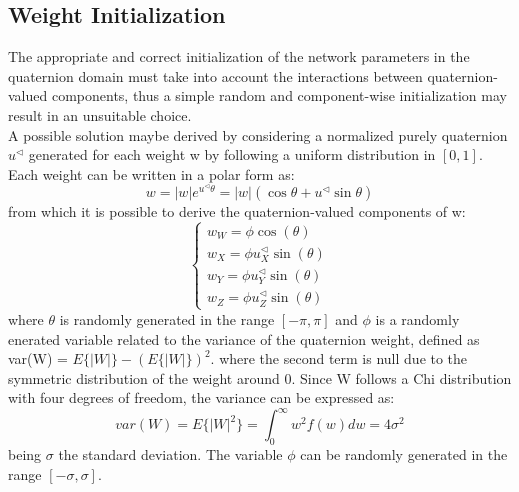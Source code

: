 \documentclass{article}
\begin{document}
    \subsection{Weight Initialization}
    The appropriate and correct initialization of the network parameters in the quaternion domain must take into account the
    interactions between quaternion-valued components,  thus a simple random and component-wise initialization may result in an 
    unsuitable choice. 
    \\ A possible solution maybe derived by considering a normalized purely quaternion  $u^\triangleleft$ generated for each weight w 
    by following a uniform distribution in $[0,1]$. 
    \\ Each weight can be written in a polar form as:
    \begin{equation*}
        w= |w|e^{u^\triangleleft \theta} = |w| (\cos{\theta} + u^\triangleleft \sin{\theta}) 
    \end{equation*}
    from which it is possible to derive the quaternion-valued components of w:
    \begin{equation*}
        \begin{cases}
            w_W = \phi \cos{(\theta)} \\
            w_X = \phi u_X^\triangleleft\sin{(\theta)} \\
            w_Y = \phi u_Y^\triangleleft\sin{(\theta)} \\
            w_Z = \phi u_Z^\triangleleft\sin{(\theta)}
        \end{cases}
    \end{equation*}
    where $\theta$ is randomly generated in the range $[-\pi, \pi]$ and $\phi$ is a randomly enerated variable related to the variance
    of the quaternion weight, defined as var(W) = $E\{|W|\} - (E\{|W|\})^2 $. where  the second term is null due to the symmetric distribution
    of the weight around 0. Since W follows a Chi distribution with four degrees of freedom, the variance can be expressed as:
    \begin{equation*}
        var(W)=E\{|W|^2\}= \int_0^\infty w^2f(w) dw = 4 \sigma^2
    \end{equation*}
    being $\sigma$ the standard deviation. The variable $\phi$ can be randomly generated in the range $[-\sigma, \sigma]$.
\end{document}
